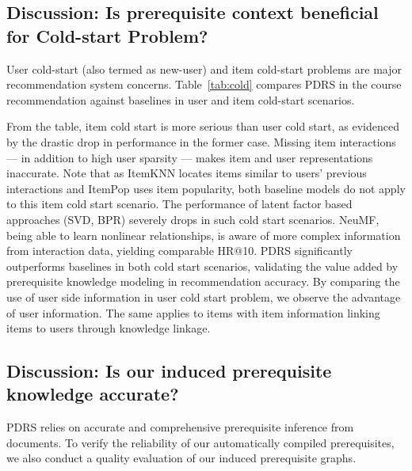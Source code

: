 \subsection{Discussion: Is prerequisite context beneficial for Cold-start Problem?}
User cold-start (also termed as new-user) and item cold-start problems \cite{schein2002methods,lam2008addressing} are major recommendation system concerns. Table~\ref{tab:cold} compares PDRS in the course recommendation against baselines in user and item cold-start scenarios. 

From the table, item cold start is more serious than user cold start, as evidenced by the drastic drop in performance in the former case. Missing item interactions --- in addition to high user sparsity --- makes item and user representations inaccurate. Note that as ItemKNN locates items similar to users' previous interactions and ItemPop uses item popularity, both baseline models do not apply to this item cold start scenario. 
The performance of latent factor based approaches (SVD, BPR) severely drops in such cold start scenarios. NeuMF, being able to learn nonlinear relationships, is aware of more complex information from interaction data, yielding comparable HR@10. 
PDRS significantly outperforms baselines in both cold start scenarios, validating the value added by prerequisite knowledge modeling in recommendation accuracy. By comparing the use of user side information in user cold start problem, we observe the advantage of user information. The same applies to items with item information linking items to users through knowledge linkage. 


\subsection{Discussion: Is our induced prerequisite knowledge accurate?}
\label{sec:rq1}
PDRS relies on accurate and comprehensive prerequisite inference from documents. To verify the reliability of our automatically compiled prerequisites, 
we also conduct a quality evaluation of our induced prerequisite graphs. 

